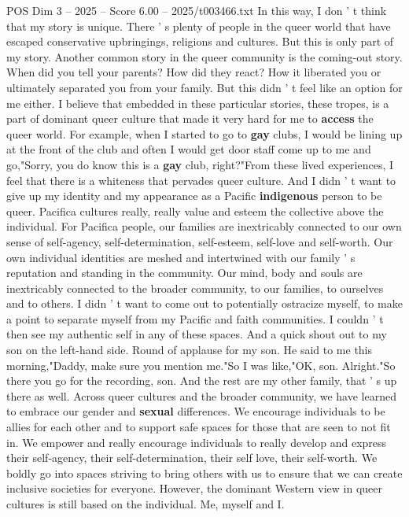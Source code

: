 \begin{textsample}{POS Dim 3 – 2025 – Score 6.00 – 2025/t003466.txt}
In this way, I don ' t think that my story is unique.
There ' s plenty of people in the queer world that have escaped conservative upbringings, religions and cultures.
But this is only part of my story.
Another common story in the queer community is the coming-out story.
When did you tell your parents?
How did they react?
How it liberated you or ultimately separated you from your family.
But this didn ' t feel like an option for me either.
I believe that embedded in these particular stories, these tropes, is a part of dominant queer culture that made it very hard for me to \textbf{access} the queer world.
For example, when I started to go to \textbf{gay} clubs, I would be lining up at the front of the club and often I would get door staff come up to me and go,"Sorry, you do know this is a \textbf{gay} club, right?"From these lived experiences, I feel that there is a whiteness that pervades queer culture.
And I didn ' t want to give up my identity and my appearance as a Pacific \textbf{indigenous} person to be queer.
Pacifica cultures really, really value and esteem the collective above the individual.
For Pacifica people, our families are inextricably connected to our own sense of self-agency, self-determination, self-esteem, self-love and self-worth.
Our own individual identities are meshed and intertwined with our family ' s reputation and standing in the community.
Our mind, body and souls are inextricably connected to the broader community, to our families, to ourselves and to others.
I didn ' t want to come out to potentially ostracize myself, to make a point to separate myself from my Pacific and faith communities.
I couldn ' t then see my authentic self in any of these spaces.
And a quick shout out to my son on the left-hand side.
Round of applause for my son.
He said to me this morning,"Daddy, make sure you mention me."So I was like,"OK, son.
Alright."So there you go for the recording, son.
And the rest are my other family, that ' s up there as well.
Across queer cultures and the broader community, we have learned to embrace our gender and \textbf{sexual} differences.
We encourage individuals to be allies for each other and to support safe spaces for those that are seen to not fit in.
We empower and really encourage individuals to really develop and express their self-agency, their self-determination, their self love, their self-worth.
We boldly go into spaces striving to bring others with us to ensure that we can create inclusive societies for everyone.
However, the dominant Western view in queer cultures is still based on the individual.
Me, myself and I.

\end{textsample}
